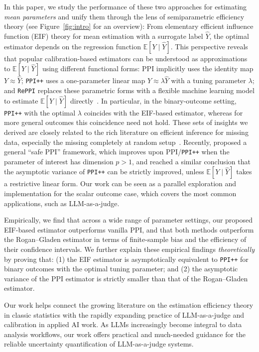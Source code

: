 \documentclass[11pt]{article}
\newcommand{\1}{\mathbf{1}}
\theoremstyle{remark}
\begin{document}
In this paper, we study the performance of these two approaches for estimating \emph{mean parameters} and unify them through the lens of semiparametric efficiency theory (see Figure~\ref{fig:intro} for an overview): From elementary efficient influence function (EIF) theory for mean estimation with a surrogate label $\widehat{Y}$, the optimal estimator depends on the regression function $\mathbb{E}[Y \mid \widehat{Y}]$. This perspective reveals that popular calibration-based estimators can be understood as approximations to $\mathbb{E}[Y \mid \widehat{Y}]$ using different functional forms: PPI implicitly uses the identity map $Y \approx \widehat{Y}$; \texttt{PPI++} uses a one-parameter linear map $Y \approx \lambda \widehat{Y}$ with a tuning parameter $\lambda$; and \texttt{RePPI} replaces these parametric forms with a flexible machine learning model to estimate $\mathbb{E}[Y \mid \widehat{Y}]$ directly~\citep{ji2025predictionssurrogatesrevisitingsurrogate}. In particular, in the binary-outcome setting, \texttt{PPI++} with the optimal $\lambda$ coincides with the EIF-based estimator, whereas for more general outcomes this coincidence need not hold. These sets of insights we derived are closely related to the rich literature on efficient inference for missing data, especially the missing completely at random setup~\citep{Chen_2008,robins1995semiparametric}. Recently, \citet{xu2025unified} proposed a general ``safe PPI'' framework, which improves upon PPI/\texttt{PPI++} when the parameter of interest has dimension $p>1$, and reached a similar conclusion that the asymptotic variance of \texttt{PPI++} can be strictly improved, unless $\mathbb{E}[Y \mid \widehat{Y}]$ takes a restrictive linear form. Our work can be seen as a parallel exploration and implementation for the scalar outcome case, which covers the most common applications, such as LLM-as-a-judge.

Empirically, we find that across a wide range of parameter settings, our proposed EIF-based estimator outperforms vanilla PPI, and that both methods outperform the Rogan--Gladen estimator in terms of finite-sample bias and the efficiency of their confidence intervals. We further explain these empirical findings \emph{theoretically} by proving that: 
(1) the EIF estimator is asymptotically equivalent to \texttt{PPI++} for binary outcomes with the optimal tuning parameter; and 
(2) the asymptotic variance of the PPI estimator is strictly smaller than that of the Rogan--Gladen estimator. 

Our work helps connect the growing literature on the estimation efficiency theory in classic statistics with the rapidly expanding practice of LLM-as-a-judge and calibration in applied AI work. As LLMs increasingly become integral to data analysis workflows, our work offers practical and much-needed guidance for the reliable uncertainty quantification of LLM-as-a-judge systems.
\end{document}
